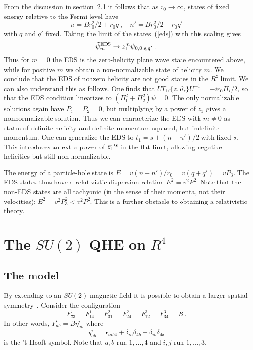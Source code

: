 \documentclass[a4paper,12pt]{article}
\newcommand{\R}{R}
\newcommand{\sect}[1]{\section{#1}\setcounter{equation}{0}}
\newcommand{\OL}[1]{ \hspace{1pt}\overline{\hspace{-1pt}#1
   \hspace{-2pt}}\hspace{2pt} }
\begin{document}
From the discussion in section~2.1 it follows that as $r_0 \to
\infty$,
states of fixed energy relative to the Fermi level have
\begin{equation}
n = B r_0^2 / 2 +  r_0 q\ ,\quad n' = B r_0^2 / 2
- r_0 q'
\end{equation}
with $q$ and $q'$ fixed. Taking the limit of the
states~(\ref{eds}) with this scaling gives
\begin{equation}
\tilde\psi^{\rm EDS}_m \to z_1^m \psi_{0,0,q,q'}\ .
\end{equation}
Thus for $m = 0$ the EDS is the zero-helicity plane wave state encountered
above, while for positive $m$ we obtain a non-normalizable state of
helicity $m$.  We conclude that the EDS of nonzero helicity are not good
states in the $\R^3$ limit.  We can also understand this as follows.
One finds that $U T_{1i}\{ z,
\partial_z\} U^{-1} = -i r_0 \Pi_i / 2$, so that the EDS condition
linearizes to $(\Pi_1^2 + \Pi_2^2) \psi = 0$.  The only normalizable
solutions again have $P_1 = P_2 = 0$, but multiplying by a power of $z_1$
gives a nonnormalizable solution.  Thus we can characterize the EDS with
$m \neq 0$ as states of definite helicity and definite momentum-squared,
but indefinite momentum. 
One can generalize the EDS to $t_1 = s + (n-n')/2$ with fixed $s$.  This
introduces an extra power of $\OL{z_1}'^s$ in the flat limit, allowing
negative helicities but still non-normalizable.

The energy of a particle-hole state is $E = v(n - n')/r_0 = v(q + q')
= v P_3$.  The EDS states thus have a relativistic dispersion relation
$E^2 = v^2 P^2$.  Note that the non-EDS states are all tachyonic (in the
sense of their momenta, not their velocities):
$E^2 = v^2 P_3^2 < v^2 P^2$.  This is a further obstacle to obtaining a
relativistic theory.


\sect{The $SU(2)$ QHE on $\R^4$}

\subsection{The model}

By extending to an $SU(2)$ magnetic field it is possible to obtain a
larger spatial symmetry~\cite{hz1}.  Consider the configuration
\begin{equation}
F^1_{23} = F^1_{14} = F^{2}_{31} = F^2_{24} = F^3_{12} = F^3_{34} = B\ .
\label{su2mag}
\end{equation}
In other words, $F^i_{ab} = B \eta^i_{ab}$ where
\begin{equation}
\eta^i_{ab} = \epsilon_{iab 4} + \delta_{ia} \delta_{4b}
- \delta_{ib} \delta_{4a}
\end{equation}
is the 't Hooft symbol.  Note that $a,b$ run $1,\ldots,4$
and $i,j$ run $1,\ldots,3$.
\end{document}
